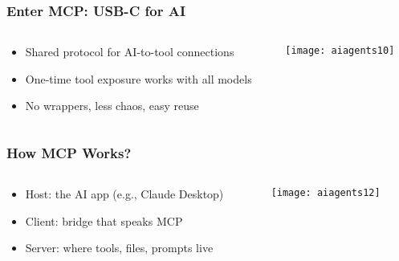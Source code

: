 \begin{frame}[fragile]\frametitle{Enter MCP: USB-C for AI}
\begin{columns}
    \begin{column}[T]{0.5\linewidth}
      \begin{itemize}
        \item Shared protocol for AI-to-tool connections
        \item One-time tool exposure works with all models
        \item No wrappers, less chaos, easy reuse
      \end{itemize}

    \end{column}
    \begin{column}[T]{0.5\linewidth}
		\begin{center}
		\texttt{[image: aiagents10]}
		\end{center}
    \end{column}
  \end{columns}
\end{frame}


\begin{frame}[fragile]\frametitle{How MCP Works?}
\begin{columns}
    \begin{column}[T]{0.5\linewidth}
      \begin{itemize}
        \item Host: the AI app (e.g., Claude Desktop)
        \item Client: bridge that speaks MCP
        \item Server: where tools, files, prompts live
      \end{itemize}

    \end{column}
    \begin{column}[T]{0.5\linewidth}
		\begin{center}
		\texttt{[image: aiagents12]}
		\end{center}
    \end{column}
  \end{columns}
\end{frame}

